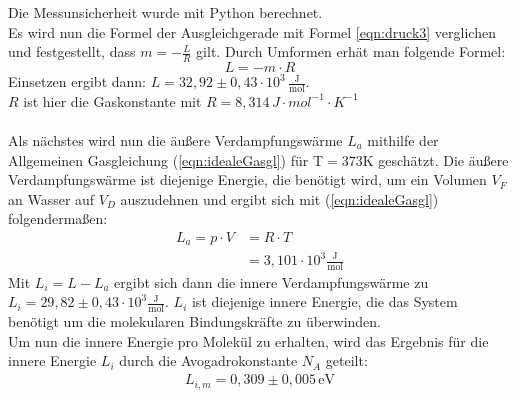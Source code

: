   Die Messunsicherheit wurde mit Python berechnet.\\
  Es wird nun die Formel der Ausgleichgerade mit Formel \ref{eqn:druck3} verglichen und
  festgestellt, dass $m=-\frac{L}{R}$ gilt. Durch Umformen erhät man folgende Formel:
  \begin{equation}
    L = - m \cdot R
  \end{equation}
  Einsetzen ergibt dann: $L = 32,92 \pm 0,43 \cdot 10^3 \, \mathrm{\frac{J}{mol}}.$ \\
  $R$ ist hier die Gaskonstante mit $R=8,314 \, J \cdot mol^{-1} \cdot K^{-1}$\\
  \\
  Als nächstes wird nun die äußere Verdampfungswärme $L_a$ mithilfe der Allgemeinen
  Gasgleichung (\ref{eqn:idealeGasgl}) für T$=373$K geschätzt. Die äußere Verdampfungswärme
  ist diejenige Energie, die benötigt wird, um ein Volumen $V_F$ an Wasser auf $V_D$ auszudehnen
  und ergibt sich mit (\ref{eqn:idealeGasgl}) folgendermaßen:
  \begin{align}
    L_a = p\cdot V &= R \cdot T \\
    &= 3,101 \cdot 10^3 \mathrm{\frac{J}{mol}}
  \end{align}
  Mit $L_i = L - L_a$ ergibt sich dann die innere Verdampfungswärme zu $L_i = 29,82 \pm 0,43 \cdot 10^3 \mathrm{\frac{J}{mol}}$.
  $L_i$ ist diejenige innere Energie, die das System benötigt um die molekularen Bindungskräfte zu überwinden. \\
  Um nun die innere Energie pro Molekül zu erhalten, wird das Ergebnis für die innere Energie $L_i$ durch die Avogadrokonstante $N_A$
  geteilt:
  \begin{align}
    L_{i,m} = 0,309 \pm 0,005 \, \mathrm{eV}
  \end{align}

